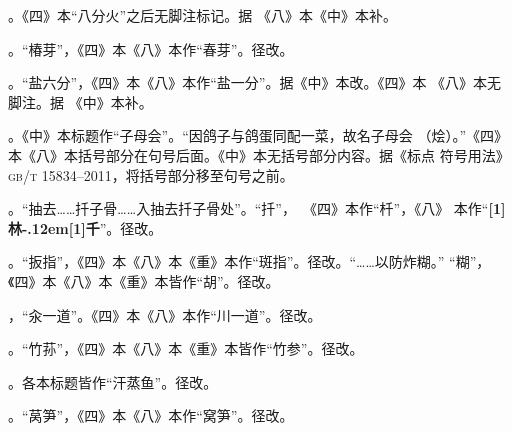 \begin{list}{}
。《四》本“八分火”之后无脚注标记{\footnotesize{}}。据
《八》本《中》本补。

。“椿芽”，《四》本《八》本作“春芽”。径改。

。“盐六分”，《四》本《八》本作“盐一分”。据《中》本改。《四》本
《八》本无脚注{\footnotesize{}}。据
《中》本补。

。《中》本标题作“子母会”。“因鸽子与鸽蛋同配一菜，故名子母会
（烩）。”《四》本《八》本括号部分在句号后面。《中》本无括号部分内容。据《标点
符号用法》\textsc{gb/t 15834--2011}，将括号部分移至句号之前。

。“抽去……扦子骨……入抽去扦子骨处”。“扦”，~《四》本作“杄”，《八》
本作“{\bfseries\scalebox{.65}[1]{林}\kern-.12em\scalebox{.55}[1]{千}}”。径改。

。“扳指”，《四》本《八》本《重》本作“斑指”。径改。“……以防炸糊。”
“糊”，《四》本《八》本《重》本皆作“胡”。径改。

，“汆一道”。《四》本《八》本作“川一道”。径改。

。“竹荪”，《四》本《八》本《重》本皆作“竹参”。径改。

。各本标题皆作“汗蒸鱼”。径改。

。“莴笋”，《四》本《八》本作“窝笋”。径改。

\end{list}
\endgroup%

